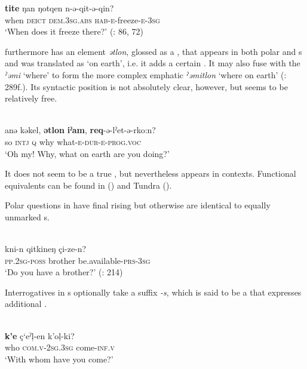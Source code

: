     \ex
    \gll \textbf{{tite}} ŋan  ŋotqen    n-ǝ-qit-ǝ-qin?\\
    when  \textsc{deict}  \textsc{dem}.3\textsc{sg}.\textsc{abs}  \textsc{hab}-\textsc{e}-freeze-\textsc{e}-3\textsc{sg}\\
    \glt ‘When does it freeze there?’ (\citealt{Dunn1999}: 86, 72)
    \z
    \z

 furthermore has an element \textit{ǝtlon}, glossed as a , that appears in both polar and s and was translated as ‘on earth’, i.e. it adds a certain . It may also fuse with the  \textit{ˀǝmi} ‘where’ to form the more complex emphatic  \textit{ˀǝmitlon} ‘where on earth’ (\citealt{Dunn1999}: 289f.). Its syntactic position is not absolutely clear, however, but seems to be relatively free.

\ea%
    \label{ex:chuk:6}
    \\
    \gll anə  kəkel, \textbf{{ətlon}} \textbf{{iˀam}}, \textbf{req}-ə-lˀet-ə-rko:n?\\
    so  \textsc{intj}  \textsc{q}  why  what-\textsc{e}-\textsc{dur}-\textsc{e}-\textsc{prog.voc}\\
    \glt ‘Oh my! Why, what on earth are you doing?’ \citep[55]{Dunn1999}
    \z

\noindent It does not seem to be a true , but nevertheless appears in  contexts. Functional equivalents can be found in  () and Tundra  ().

Polar questions in  have final rising  but otherwise are identical to equally unmarked s.

\ea%
    \label{ex:chuk:7}
    \\
    \gll kni-n    qitkineŋ  çi-ze-n?\\
    \textsc{pp}.2\textsc{sg}-\textsc{poss}  brother    be.available-\textsc{prs}-3\textsc{sg}\\
    \glt ‘Do you have a brother?’ (\citealt{GeorgVolodin1999}: 214)
    \z

Interrogatives in s optionally take a suffix \textit{-s}, which is said to be a  that expresses additional .

\ea%
    \label{ex:chuk:8}
    \\
    \ea
    \gll \textbf{{k’e}} ç‘eˀ\c{l}-en    k’o\c{l}-ki?\\
    who    \textsc{com.v}-2\textsc{sg}.3\textsc{sg}  come-\textsc{inf}.\textsc{v}\\
    \glt ‘With whom have you come?’

